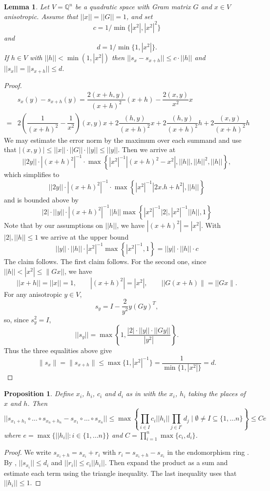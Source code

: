 \documentclass[11pt,letterpaper]{amsart}
\newcommand{\QQ}{\mathbb{Q}}
\newtheorem{proposition}[theorem]{Proposition}
\newtheorem{lemma}[theorem]{Lemma}
\theoremstyle{definition}
\theoremstyle{remark}
\begin{document}
\begin{lemma}\label{lem:error}
Let $V=\QQ^n$ be a quadratic space with Gram matrix $G$ and $x \in V$ anisotropic. Assume that $||x||=||G||=1$, and set
\[ c = 1/\min\{|x^2|,|x^2|^2\}\]
and 
\[d = 1/ \min\{1, |x^2|\}.\]
If $h \in V$ with $||h|| < \min(1, |x^2|)$ then 
$ || s_x - s_{x+h}|| \leq c \cdot ||h||$
and 
\(||s_x|| = ||s_{x+h}|| \leq d. \)
\end{lemma}
\begin{proof}
\[\begin{array}{ll}
    & s_{x}(y) - s_{x+h}(y) = \dfrac{2 (x+h,y)}{(x+h)^2}(x+h) - \dfrac{2 (x,y)}{x^2}x\\[15pt]
    =& 2\left(\dfrac{1}{(x+h)^2}-\dfrac{1}{x^2} \right)(x,y) x
     + 2\dfrac{(h,y)}{(x+h)^2}x    + 2\dfrac{(h,y)}{(x+h)^2}h
     + 2\dfrac{(x,y)}{(x+h)^2}h 
\end{array}\]
We may estimate the error norm by the maximum over each summand and use that $|(x,y)|\leq ||x|| \cdot ||G|| \cdot ||y|| \leq ||y||$. 
Then we arrive at 
\[||2y|| \cdot  |(x+h)^2|^{-1} \cdot \max \left\{|x^2|^{-1}|(x+h)^2 - x^2| ,||h||, ||h||^2, ||h||\right\},\]
which simplifies to 
\[||2y|| \cdot |(x+h)^2|^{-1} \cdot \max \left\{|x^2|^{-1}|2x.h + h^2| , ||h||\right\}\]
and is bounded above by
\[|2| \cdot ||y|| \cdot  |(x+h)^2|^{-1} ||h|| \max \left\{ |x^2|^{-1}|2|, |x^2|^{-1} ||h|| , 1 \right\}\]
Note that by our assumptions on $||h||$, we have $|(x+h)^2| = |x^2|$. 
With $|2|, ||h|| \leq 1$ we arrive at the upper bound
\[||y|| \cdot ||h|| \cdot |x^2|^{-1} \max \left\{ |x^2|^{-1}, 1 \right\} =||y|| \cdot ||h|| \cdot  c  \]
The claim follows.
The first claim follows. For the second one, since $||h||<|x^2| \le \|Gx||$, we have
\[
||x+h||=||x||=1,\qquad |(x+h)^2|=|x^2|,\qquad ||G(x+h)\|=||Gx\|.
\]
For any anisotropic $y\in V$,
\[
s_y=I-\frac{2}{y^2}y(Gy)^T,
\]
so, since $s_y^2=I$,
\[
||s_y||=\max\left\{1,\frac{|2|\cdot ||y||\cdot ||Gy||}{|y^2|}\right\}.
\]
Thus the three equalities above give
\[
\|s_x\|=\|s_{x+h}\|
\le \max\{1,|x^2|^{-1}\}
=\frac1{\min\{1,|x^2|\}}=d.
\]
\end{proof}
\begin{proposition}
    Define $x_i$, $h_i$, $c_i$ and $d_i$ as in  with the $x_i$, $h_i$ taking the places of $x$ and $h$. Then
\[|| s_{x_1+h_1} \circ \dots \circ s_{x_n+h_n} - s_{x_1}\circ \dots \circ s_{x_n}|| \leq  \max\left\{ \prod_{i \in I} c_i ||h_i|| \prod_{j \in I^c} d_j \mid \emptyset \neq I \subseteq \{1,\dots n\}\right\} \leq C e \]
where $e = \max\{||h_i|| : i \in \{1,\dots n\}\}$ 
and $C = \prod_{i=1}^n\max\{c_i, d_i\}$.
\end{proposition}
\begin{proof}
We write $s_{x_i+h} = s_{x_i}+r_i$ with $r_i = s_{x_i+h}-s_{x_i}$ in the endomorphism ring . By , $||s_{x_i}|| \leq d_i$ and $||r_i|| \leq c_i ||h_i||$. Then expand the product as a sum and estimate each term using the triangle inequality. The last inequality uses that $||h_i||\leq 1$.
\end{proof}
\end{document}
